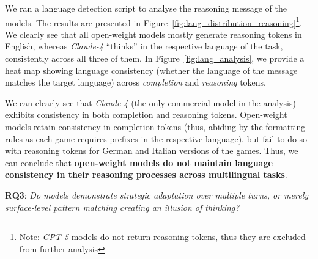 \documentclass[11pt]{article}
\begin{document}




We ran a language detection script to analyse the reasoning message of the models. The results are presented in Figure~\ref{fig:lang_distribution_reasoning}\footnote{Note: \textit{GPT-5} models do not return reasoning tokens, thus they are excluded from further analysis}. We clearly see that all open-weight models mostly generate reasoning tokens in English, whereas \textit{Claude-4} ``thinks'' in the respective language of the task, consistently across all three of them. In Figure~\ref{fig:lang_analysis}, we provide a heat map showing language consistency (whether the language of the message matches the target language) across \textit{completion} and \textit{reasoning} tokens. 



We can clearly see that \textit{Claude-4} (the only commercial model in the analysis) exhibits consistency in both completion and reasoning tokens. Open-weight models retain consistency in completion tokens (thus, abiding by the formatting rules as each game requires prefixes in the respective language), but fail to do so with reasoning tokens for German and Italian versions of the games. Thus, we can conclude that \textbf{open-weight models do not maintain language consistency in their reasoning processes across multilingual tasks}.




\textbf{RQ3}: \textit{Do models demonstrate strategic adaptation over multiple turns, or merely surface-level pattern matching creating an illusion of thinking?}
\end{document}
